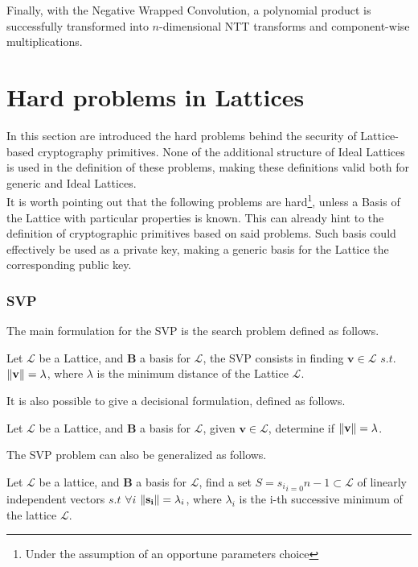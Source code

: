 Finally, with the Negative Wrapped Convolution, a polynomial product is successfully transformed into $n$-dimensional NTT transforms and component-wise multiplications.

\section{Hard problems in Lattices}\label{sec:bg:prob}
In this section are introduced the hard problems behind the security of Lattice-based cryptography primitives. None of the additional structure of Ideal Lattices is used in the definition of these problems, making these definitions valid both for generic and Ideal Lattices.\\
It is worth pointing out that the following problems are hard\footnote{Under the assumption of an opportune parameters choice}, unless a Basis of the Lattice with particular properties is known. This can already hint to the definition of cryptographic primitives based on said problems. Such basis could effectively be used as a private key, making a generic basis for the Lattice the corresponding public key.

\subsubsection{SVP}

The main formulation for the SVP is the search problem defined as follows.

\begin{definition}
Let $\mathscr{L}$ be a Lattice, and $\mathbf{B}$ a basis for $\mathscr{L}$, the SVP consists in finding $\mathbf{v}\in\mathscr{L}$ $s.t.$ $\left\lVert \mathbf{v} \right\rVert = \lambda$, where $\lambda$ is the minimum distance of the Lattice $\mathscr{L}$.
\end{definition}

It is also possible to give a decisional formulation, defined as follows.

\begin{definition}
Let $\mathscr{L}$ be a Lattice, and $\mathbf{B}$ a basis for $\mathscr{L}$, given $\mathbf{v}\in\mathscr{L}$, determine if $\left\lVert \mathbf{v} \right\rVert = \lambda$.
\end{definition}

The SVP problem can also be generalized as follows.

\begin{definition}
Let $\mathscr{L}$ be a lattice, and $\mathbf{B}$ a basis for $\mathscr{L}$, find a set $S={s_i}_{i=0}{n-1}\subset \mathscr{L}$ of linearly independent vectors $s.t$ $\forall i$ $\left\lVert \mathbf{s_i} \right\rVert = \lambda_i$, where $\lambda_i$ is the i-th successive minimum of the lattice $\mathscr{L}$.
\end{definition}

